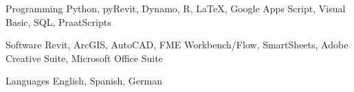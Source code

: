 


\begin{cvskills}


\cvskill
{Programming} %
{Python, pyRevit, Dynamo, R, LaTeX, Google Apps Script, Visual Basic, SQL, PraatScripts} %


\cvskill
{Software} %
{Revit, ArcGIS, AutoCAD, FME Workbench/Flow, SmartSheets, Adobe Creative Suite, Microsoft Office Suite} 


\cvskill
{Languages} %
{English, Spanish, German} %

\vspace{-7mm}
\end{cvskills}